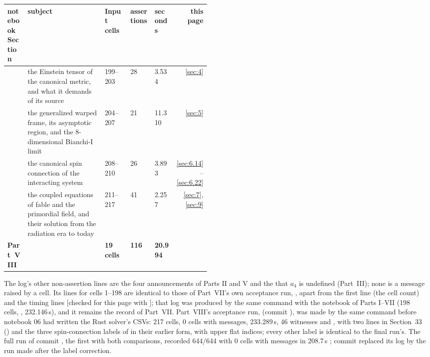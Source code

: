 {\small
\begin{longtable}{@{}>{\raggedright\arraybackslash}p{0.1\linewidth}>{\raggedright\arraybackslash}p{0.38\linewidth}lllr@{}}
\toprule
notebook Section & subject & Input cells & assertions & seconds & this page \tabularnewline
\midrule
\endhead
30 & the Einstein tensor of the canonical metric, and what it demands of its source & 199--203 & 28 & 3.534 & \ref{sec:4} \tabularnewline
31 & the generalized warped frame, its asymptotic region, and the 8-dimensional Bianchi-I limit & 204--207 & 21 & 11.310 & \ref{sec:5} \tabularnewline
32 & the canonical spin connection of the interacting system & 208--210 & 26 & 3.893 & \ref{sec:6.14}--\ref{sec:6.22} \tabularnewline
33 & the coupled equations of fable and the primordial field, and their solution from the radiation era to today & 211--217 & 41 & 2.257 & \ref{sec:7}, \ref{sec:9} \tabularnewline
\textbf{Part~VIII} &  & \textbf{19 cells} & \textbf{116} & \textbf{20.994} &  \tabularnewline
\bottomrule
\end{longtable}
}

The log's other non-assertion lines are the four  announcements of Parts II and V
and the  that $a_4$ is undefined (Part~III); none is a message raised by a cell. Its lines for
cells 1--198 are identical to those of Part~VII's own acceptance run,
, apart from the first line (the cell count) and the timing
lines [checked for this page with ]; that log was produced by the same command with the notebook
of Parts I--VII (198 cells, , 232.146\,s), and it
remains the record of Part~VII. Part~VIII's acceptance run, 
(commit ), was made by the same command before notebook 06 had written the Rust solver's CSVs:
217 cells, 0 cells with messages, 233.289\,s, 46 witnesses and
, with two
 lines in Section~33
() and the three spin-connection labels of  in their earlier form, with
upper flat indices; every other  label is identical to the final run's. The full run of commit
, the first with both comparisons, recorded 644/644 with 0 cells with messages in 208.7\,s
; commit  replaced its log by the run made after the label correction.

